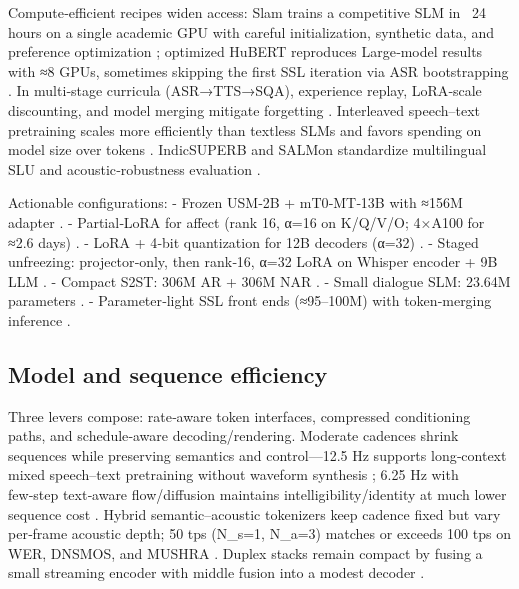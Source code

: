 \documentclass{article}
\begin{document}
Compute‑efficient recipes widen access: Slam trains a competitive SLM in ~24 hours on a single academic GPU with careful initialization, synthetic data, and preference optimization \cite{maimon2025slammingtrainingspeechlanguagemodelonegp}; optimized HuBERT reproduces Large‑model results with ≈8 GPUs, sometimes skipping the first SSL iteration via ASR bootstrapping \cite{chen2023reducingbarriersselfsupervisedlearninghu}. In multi‑stage curricula (ASR→TTS→SQA), experience replay, LoRA‑scale discounting, and model merging mitigate forgetting \cite{hsiao2025analyzingmitigationstrategiescatastrophi}. Interleaved speech–text pretraining scales more efficiently than textless SLMs and favors spending on model size over tokens \cite{maimon2025scalinganalysisinterleavedspeechtextlang}. IndicSUPERB and SALMon standardize multilingual SLU and acoustic‑robustness evaluation \cite{entry2025indicsuperbspeechprocessinguniversalperf,maimon2025salmonsuiteacousticlanguagemodelevaluati}.

Actionable configurations:
- Frozen USM‑2B + mT0‑MT‑13B with ≈156M adapter \cite{wang2023slmbridgethingapbetweenspeechtextfoundat}.
- Partial‑LoRA for affect (rank 16, α=16 on K/Q/V/O; 4×A100 for ≈2.6 days) \cite{wang2024blspemotowardsempatheticlargespeechlangu}.
- LoRA + 4‑bit quantization for 12B decoders (α=32) \cite{nguyen2025qwenvsgemmaintegrationwhispercomparative}.
- Staged unfreezing: projector‑only, then rank‑16, α=32 LoRA on Whisper encoder + 9B LLM \cite{li2025seewossubmissionmlcslmlessonslearnedspee}.
- Compact S2ST: 306M AR + 306M NAR \cite{peng2024mslms2stmultitaskspeechlanguagemodeltext}.
- Small dialogue SLM: 23.64M parameters \cite{nakata2024jchatjapaneselargescalespokendialoguecor}.
- Parameter‑light SSL front ends (≈95–100M) with token‑merging inference \cite{chen2023reducingbarriersselfsupervisedlearninghu,lu2024fastadaspmultitaskadaptedefficientinfere,maimon2025scalinganalysisinterleavedspeechtextlang}.

\subsection{Model and sequence efficiency} \label{subsec:Model and sequence efficiency}
Three levers compose: rate‑aware token interfaces, compressed conditioning paths, and schedule‑aware decoding/rendering. Moderate cadences shrink sequences while preserving semantics and control—12.5 Hz supports long‑context mixed speech–text pretraining without waveform synthesis \cite{zeng2024scalingspeechtextpretrainingsyntheticint}; 6.25 Hz with few‑step text‑aware flow/diffusion maintains intelligibility/identity at much lower sequence cost \cite{wang2025tadicodectextawarediffusionspeechtokeniz}. Hybrid semantic–acoustic tokenizers keep cadence fixed but vary per‑frame acoustic depth; 50 tps (N_s=1, N_a=3) matches or exceeds 100 tps on WER, DNSMOS, and MUSHRA \cite{yang2025diffsoundstreamefficientspeechtokenizati}. Duplex stacks remain compact by fusing a small streaming encoder with middle fusion into a modest decoder \cite{ma2024languagemodelcanlistenwhilespeaking}.
\end{document}
